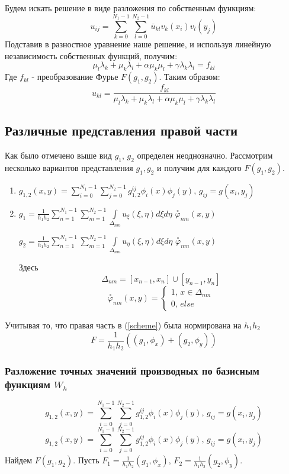 \documentclass{article}
\begin{document}
Будем искать решение в виде разложения по собственным функциям:
$$u_{ij} = \sum \limits_{k=0}^{N_1 - 1} \sum \limits_{l=0}^{N_2 - 1} \overline{u}_{kl}v_k(x_i)v_l(y_j)$$
Подставив в разностное уравнение наше решение, и используя линейную независимость собственных функций, получим:
$$\mu_l \lambda_k + \mu_k \lambda_l + \alpha \mu_k \mu_l + \gamma \lambda_k \lambda_l = f_{kl}$$
Где $f_{kl}$ - преобразование Фурье $F(g_1,g_2)$.
Таким образом:
$$u_{kl} = \frac{f_{kl}}{\mu_l \lambda_k + \mu_k \lambda_l + \alpha \mu_k \mu_l + \gamma \lambda_k \lambda_l}$$
\subsection{Различные представления правой части}
Как было отмечено выше вид $g_1,\,g_2$ определен неоднозначно. Рассмотрим несколько вариантов представления $g_1, g_2$ и получим для каждого $F(g_1,g_2)$.
\begin{enumerate}
\item$g_{1,2}(x,y) = \sum \limits_{i=0}^{N_1-1} \sum \limits_{j=0}^{N_2-1}g_{1,2}^{ij}\phi_i(x)\phi_j(y),\, g_{ij} = g(x_i,y_j)$
\item$g_1 = \frac{1}{h_1h_2} \sum \limits_{n=1}^{N_1 - 1} \sum \limits_{m=1}^{N_2 - 1} \int \limits _{\Delta_{nm}} u_\xi(\xi,\eta) d\xi d\eta$ $\overset{\circ}{\varphi}_{nm}(x,y)$

$g_2 = \frac{1}{h_1h_2} \sum \limits_{n=1}^{N_1 - 1} \sum \limits_{m=1}^{N_2 - 1} \int \limits _{\Delta_{nm}} u_\eta(\xi,\eta) d\xi d\eta$ $\overset{\circ}{\varphi}_{nm}(x,y)$ 

Здесь
$$\Delta_{nm} = [x_{n-1}, x_n] \cup [y_{n-1}, y_n] $$
$$\overset{\circ}{\varphi}_{nm}(x,y) = \begin{cases} 1, \, x \in \Delta_{nm} \\ 0, \, else\end{cases}$$ 
\end{enumerate}
Учитывая то, что правая часть в (\ref{scheme}) была нормирована на $h_1h_2$
\begin{equation}\label{F}
F = \frac{1}{h_1h_2}((g_1,\phi_x) + (g_2,\phi_y))
\end{equation} 
\subsubsection{Разложение точных значений производных по базисным функциям $W_h$}
$$g_{1,2}(x,y) = \sum \limits_{i=0}^{N_1-1} \sum \limits_{j=0}^{N_2-1}g_{1,2}^{ij}\phi_i(x)\phi_j(y),\, g_{ij} = g(x_i,y_j)$$
$$g_{1,2}(x,y) = \sum \limits_{i=0}^{N_1-1} \sum \limits_{j=0}^{N_2-1}g_{1,2}^{ij}\phi_i(x)\phi_j(y),\, g_{ij} = g(x_i,y_j)$$
Найдем $F(g_1,g_2)$. 
Пусть $F_1 = \frac{1}{h_1h_2}(g_1,\phi_x),\, F_2 = \frac{1}{h_1h_2}(g_2, \phi_y)$.
\end{document}
